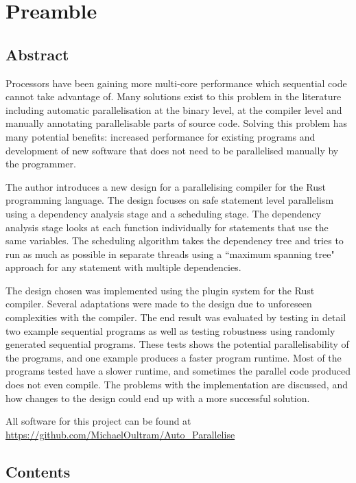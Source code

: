 \chapter{Preamble}
\section{Abstract}
Processors have been gaining more multi-core performance which sequential code cannot take advantage of. Many solutions exist to this problem in the literature including automatic parallelisation at the binary level, at the compiler level and manually annotating parallelisable parts of source code. Solving this problem has many potential benefits: increased performance for existing programs and development of new software that does not need to be parallelised manually by the programmer.

The author introduces a new design for a parallelising compiler for the Rust programming language. The design focuses on safe statement level parallelism using a dependency analysis stage and a scheduling stage. The dependency analysis stage looks at each function individually for statements that use the same variables. The scheduling algorithm takes the dependency tree and tries to run as much as possible in separate threads using a ``maximum spanning tree" approach for any statement with multiple dependencies.

The design chosen was implemented using the plugin system for the Rust compiler. Several adaptations were made to the design due to unforeseen complexities with the compiler. The end result was evaluated by testing in detail two example sequential programs as well as testing robustness using randomly generated sequential programs. These tests shows the potential parallelisability of the programs, and one example produces a faster program runtime. Most of the programs tested have a slower runtime, and sometimes the parallel code produced does not even compile. The problems with the implementation are discussed, and how changes to the design could end up with a more successful solution.

\begin{center}
All software for this project can be found at \\
\url{https://github.com/MichaelOultram/Auto\_Parallelise}
\end{center}

\newpage
\section{Contents}
\makeatletter
\newcommand*{\toccontents}{}
\makeatother
\toccontents
